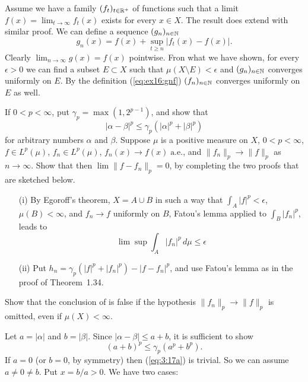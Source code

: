 \begin{enumerate}
Assume we have a family \((f_t)_{t\in\mathbb{R}^+}\) of functions
such that a limit \(f(x) = \lim_{t\to\infty} f_t(x)\) exists
for every \(x\in X\).
The result does  extend with similar proof.
We can define a sequence \((g_n)_{n\in\mathbb{N}}\)
\begin{equation} \label{eq:ex16:gnf}
 g_n(x) = f(x) + \sup_{t\geq n} |f_t(x) - f(x)|.
\end{equation}
Clearly \(\lim_{n\to\infty} g(x) = f(x)\) pointwise.
Fron what we have shown, for every \(\epsilon > 0\)
we can find a subset \(E\subset X\) such that \(\mu(X\setminus E) < \epsilon\)
and \((g_n)_{n\in\mathbb{N}}\) converges uniformly on $E$.
By the definition (\ref{eq:ex16:gnf})
\((f_n)_{n\in\mathbb{N}}\) converges uniformly on $E$ as well.


\begin{excopy}
\begin{itemize}
 If \(0<p<\infty\), put \(\gamma_p = \max(1,2^{p-1})\), and show that
 \begin{equation*}
 |\alpha - \beta|^p \leq \gamma_p(|\alpha|^p + |\beta|^p)
 \end{equation*}
 for arbitrary numbers \(\alpha\) and \(\beta\).
   Suppose \(\mu\) is a positive measure on $X$, \(0<p<\infty\),
   \(f\in L^p(\mu)\), \(f_n\in L^p(\mu)\), \(f_n(x)\to f(x)\;\textrm{a.e.}\),
   and \(\|f_n\|_p \to \|f\|_p\) as \(n\to\infty\).
   Show that then \(\lim\|f-f_n\|_p = 0\),
   by completing the two proofs that are sketched below.
  \begin{itemize}
   \item[(i)]
    By Egoroff's theorem, \(X=A\cup B\) in such a way that
    \(\int_A|f|^p<\epsilon\), \(\mu(B)<\infty\), and \(f_n\to f\) uniformly
    on $B$, Fatou's lemma applied to \(\int_B|f_n|^p\), leads to
    \begin{equation*}
      \lim\sup \int_A |f_n|^p\,d\mu \leq \epsilon
    \end{equation*}
   \item[(ii)]
    Put \(h_n = \gamma_p(|f|^p + |f_n|^p) - |f-f_n|^p\),
    and use Fatou's lemma as in the proof of Theorem~1.34.
  \end{itemize}
 Show that the conclusion of  is false if the hypothesis
 \(\|f_n\|_p \to \|f\|_p\) is omitted, even if \(\mu(X)<\infty\).
\end{itemize}
\end{excopy}


\begin{itemize}
 Let \(a=|\alpha|\) and \(b=|\beta|\).
 Since \(|\alpha - \beta| \leq a + b\), it is sufficient to show
 \begin{equation} \label{eq:3:17a}
   (a+b)^p \leq \gamma_p(a^p + b^p).
 \end{equation}
 If \(a=0\) (or \(b=0\), by symmetry)
 then (\ref{eq:3:17a}) is trivial. So we can assume \(a\neq 0 \neq b\).
 Put \(x = b/a > 0\).
 We have two cases:


\end{itemize}
\end{enumerate}
